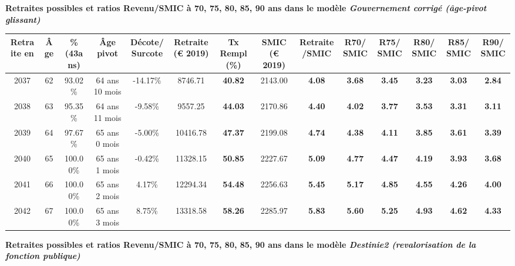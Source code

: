  \vspace{0.1cm} 
{\bf \noindent Retraites possibles et ratios Revenu/SMIC à 70, 75, 80, 85, 90 ans dans le modèle \emph{Gouvernement corrigé (âge-pivot glissant)}}  
 
\begin{adjustbox}{max width=\textwidth} 
\begin{tabular}[htb]{|c|c||c|c|c||c|c||c|c||c|c|c|c|c|} 
\hline 
 Retraite en &  Âge &  \%(43ans) &  Âge pivot &  Décote/Surcote &  Retraite (\euro{} 2019) &  Tx Rempl(\%) &  SMIC (\euro{} 2019) &  Retraite/SMIC &  R70/SMIC &  R75/SMIC &  R80/SMIC &  R85/SMIC &  R90/SMIC \\ 
\hline \hline 
 2037 &  62 &  93.02\% &  64 ans 10 mois &  -14.17\% &  8746.71 &  {\bf 40.82} &  2143.00 &  {\bf 4.08} &  {\bf 3.68} &  {\bf 3.45} &  {\bf 3.23} &  {\bf 3.03} &  {\bf 2.84} \\ 
\hline 
 2038 &  63 &  95.35\% &  64 ans 11 mois &  -9.58\% &  9557.25 &  {\bf 44.03} &  2170.86 &  {\bf 4.40} &  {\bf 4.02} &  {\bf 3.77} &  {\bf 3.53} &  {\bf 3.31} &  {\bf 3.11} \\ 
\hline 
 2039 &  64 &  97.67\% &  65 ans 0 mois &  -5.00\% &  10416.78 &  {\bf 47.37} &  2199.08 &  {\bf 4.74} &  {\bf 4.38} &  {\bf 4.11} &  {\bf 3.85} &  {\bf 3.61} &  {\bf 3.39} \\ 
\hline 
 2040 &  65 &  100.00\% &  65 ans 1 mois &  -0.42\% &  11328.15 &  {\bf 50.85} &  2227.67 &  {\bf 5.09} &  {\bf 4.77} &  {\bf 4.47} &  {\bf 4.19} &  {\bf 3.93} &  {\bf 3.68} \\ 
\hline 
 2041 &  66 &  100.00\% &  65 ans 2 mois &  4.17\% &  12294.34 &  {\bf 54.48} &  2256.63 &  {\bf 5.45} &  {\bf 5.17} &  {\bf 4.85} &  {\bf 4.55} &  {\bf 4.26} &  {\bf 4.00} \\ 
\hline 
 2042 &  67 &  100.00\% &  65 ans 3 mois &  8.75\% &  13318.58 &  {\bf 58.26} &  2285.97 &  {\bf 5.83} &  {\bf 5.60} &  {\bf 5.25} &  {\bf 4.93} &  {\bf 4.62} &  {\bf 4.33} \\ 
\hline 
\hline 
\end{tabular} 
\end{adjustbox} 
 
 \vspace{0.1cm} 
{\bf \noindent Retraites possibles et ratios Revenu/SMIC à 70, 75, 80, 85, 90 ans dans le modèle \emph{Destinie2 (revalorisation de la fonction publique)}}  
 
